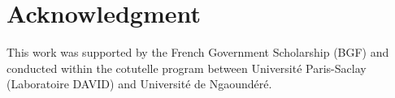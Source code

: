 \documentclass[conference]{IEEEtran}
\begin{document}
\section*{Acknowledgment}
This work was supported by the French Government Scholarship (BGF) and conducted
within the cotutelle program between Universit\'e Paris-Saclay (Laboratoire
DAVID) and Universit\'e de Ngaound\'er\'e.



\end{document}
